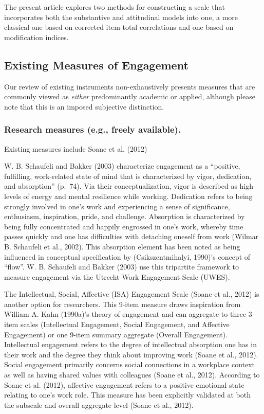 \documentclass[
  man]{apa6}
\begin{document}
The present article explores two methods for constructing a scale that incorporates both the substantive and attitudinal models into one, a more classical one based on corrected item-total correlations and one based on modification indices.

\hypertarget{existing-measures-of-engagement}{%
\subsection{Existing Measures of Engagement}\label{existing-measures-of-engagement}}

Our review of existing instruments non-exhaustively presents measures that are commonly viewed as \emph{either} predominantly academic or applied, although please note that this is an imposed subjective distinction.

\hypertarget{research-measures-e.g.-freely-available.}{%
\subsubsection{Research measures (e.g., freely available).}\label{research-measures-e.g.-freely-available.}}

Existing measures include Soane et al. (2012)

W. B. Schaufeli and Bakker (2003) characterize engagement as a ``positive, fulfilling, work-related state of mind that is characterized by vigor, dedication, and absorption'' (p.~74). Via their conceptualization, vigor is described as high levels of energy and mental resilience while working. Dedication refers to being strongly involved in one's work and experiencing a sense of significance, enthusiasm, inspiration, pride, and challenge. Absorption is characterized by being fully concentrated and happily engrossed in one's work, whereby time passes quickly and one has difficulties with detaching oneself from work (Wilmar B. Schaufeli et al., 2002). This absorption element has been noted as being influenced in conceptual specification by (Csikszentmihalyi, 1990)'s concept of ``flow''. W. B. Schaufeli and Bakker (2003) use this tripartite framework to measure engagement via the Utrecht Work Engagement Scale (UWES).

The Intellectual, Social, Affective (ISA) Engagement Scale (Soane et al., 2012) is another option for researchers. This 9-item measure draws inspiration from William A. Kahn (1990a)'s theory of engagement and can aggregate to three 3-item scales (Intellectual Engagement, Social Engagement, and Affective Engagement) or one 9-item summary aggregate (Overall Engagement). Intellectual engagement refers to the degree of intellectual absorption one has in their work and the degree they think about improving work (Soane et al., 2012). Social engagement primarily concerns social connections in a workplace context as well as having shared values with colleagues (Soane et al., 2012). According to Soane et al. (2012), affective engagement refers to a positive emotional state relating to one's work role. This measure has been explicitly validated at both the subscale and overall aggregate level (Soane et al., 2012).
\end{document}
